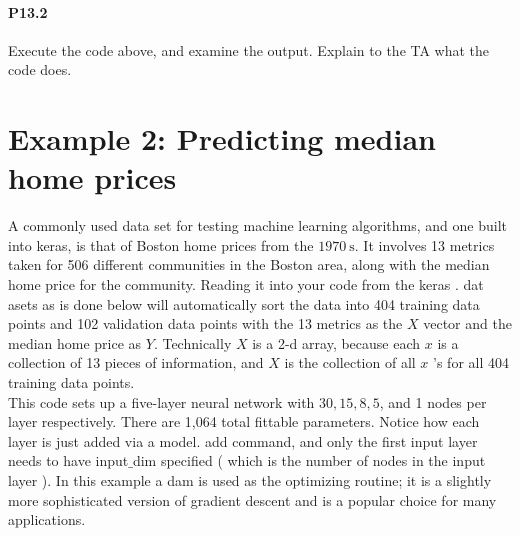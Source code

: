 \paragraph*{P13.2}Execute the code above, and examine the output. Explain to the TA what
the code does.



\section*{Example 2: Predicting median home prices}
A commonly used data set for testing machine learning algorithms, and one built into keras, is that of Boston home prices from the $1970 \mathrm{~s}$. It involves 13 metrics taken for 506 different communities in the Boston area, along with the median home price for the community. Reading it into your code from the keras . dat asets as is done below will automatically sort the data into 404 training data points and 102 validation data points with the 13 metrics as the $X$ vector and the median home price as $Y$. Technically $X$ is a 2-d array, because each $x$ is a collection of 13 pieces of information, and $X$ is the collection of all $x$ 's for all 404 training data points.\\
This code sets up a five-layer neural network with $30,15,8,5$, and 1 nodes per layer respectively. There are 1,064 total fittable parameters. Notice how each layer is just added via a model. add command, and only the first input layer needs to have input$\_$dim specified ( which is the number of nodes in the input layer ). In this example a dam is used as the optimizing routine; it is a slightly more sophisticated version of gradient descent and is a popular choice for many
applications.

